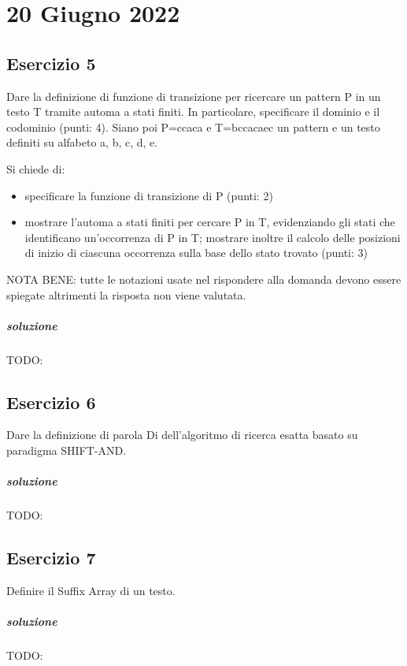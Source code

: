 \chapter{20 Giugno 2022}

\section{Esercizio 5}

Dare la definizione di funzione di transizione per ricercare un pattern P in un testo T tramite automa a stati finiti. In particolare, specificare il dominio e il codominio (punti: 4). Siano poi P=ccaca e T=bccacaec un pattern e un testo definiti su alfabeto {a, b, c, d, e}.

Si chiede di:
\begin{itemize}
    \item specificare la funzione di transizione di P (punti: 2)
    \item mostrare l'automa a stati finiti per cercare P in T, evidenziando gli stati che identificano un'occorrenza di P in T; mostrare inoltre il calcolo delle posizioni di inizio di ciascuna occorrenza sulla base dello stato trovato (punti: 3)
\end{itemize}

NOTA BENE: tutte le notazioni usate nel rispondere alla domanda devono essere spiegate altrimenti la risposta non viene valutata.

\paragraph{soluzione} TODO:

\section{Esercizio 6}

Dare la definizione di parola Di dell'algoritmo di ricerca esatta basato su paradigma SHIFT-AND.

\paragraph{soluzione} TODO:

\section{Esercizio 7}

Definire il Suffix Array di un testo.

\paragraph{soluzione} TODO:
